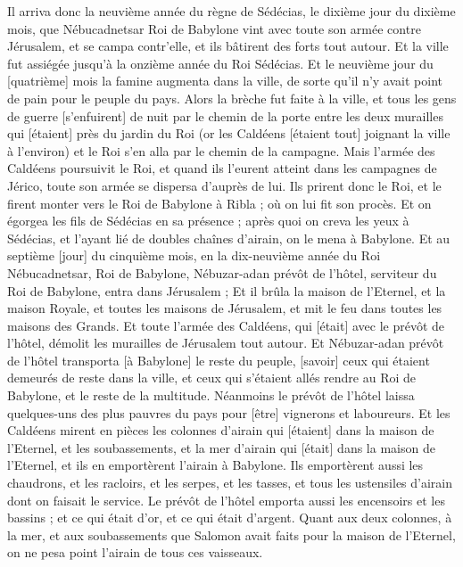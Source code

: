\begin{multicols}{2}
\VerseOne{}Il arriva donc la neuvième année du règne de Sédécias, le dixième jour du dixième mois, que Nébucadnetsar Roi de Babylone vint avec toute son armée contre Jérusalem, et se campa contr'elle, et ils bâtirent des forts tout autour.
Et la ville fut assiégée jusqu'à la onzième année du Roi Sédécias.
Et le neuvième jour du [quatrième] mois la famine augmenta dans la ville, de sorte qu'il n'y avait point de pain pour le peuple du pays.
Alors la brèche fut faite à la ville, et tous les gens de guerre [s'enfuirent] de nuit par le chemin de la porte entre les deux murailles qui [étaient] près du jardin du Roi (or les Caldéens [étaient tout] joignant la ville à l'environ) et le Roi s'en alla par le chemin de la campagne.
Mais l'armée des Caldéens poursuivit le Roi, et quand ils l'eurent atteint dans les campagnes de Jérico, toute son armée se dispersa d'auprès de lui.
Ils prirent donc le Roi, et le firent monter vers le Roi de Babylone à Ribla ; où on lui fit son procès.
Et on égorgea les fils de Sédécias en sa présence ; après quoi on creva les yeux à Sédécias, et l'ayant lié de doubles chaînes d'airain, on le mena à Babylone.
Et au septième [jour] du cinquième mois, en la dix-neuvième année du Roi Nébucadnetsar, Roi de Babylone, Nébuzar-adan prévôt de l'hôtel, serviteur du Roi de Babylone, entra dans Jérusalem ;
Et il brûla la maison de l'Eternel, et la maison Royale, et toutes les maisons de Jérusalem, et mit le feu dans toutes les maisons des Grands.
Et toute l'armée des Caldéens, qui [était] avec le prévôt de l'hôtel, démolit les murailles de Jérusalem tout autour.
Et Nébuzar-adan prévôt de l'hôtel transporta [à Babylone] le reste du peuple, [savoir] ceux qui étaient demeurés de reste dans la ville, et ceux qui s'étaient allés rendre au Roi de Babylone, et le reste de la multitude.
Néanmoins le prévôt de l'hôtel laissa quelques-uns des plus pauvres du pays pour [être] vignerons et laboureurs.
Et les Caldéens mirent en pièces les colonnes d'airain qui [étaient] dans la maison de l'Eternel, et les soubassements, et la mer d'airain qui [était] dans la maison de l'Eternel, et ils en emportèrent l'airain à Babylone.
Ils emportèrent aussi les chaudrons, et les racloirs, et les serpes, et les tasses, et tous les ustensiles d'airain dont on faisait le service.
Le prévôt de l'hôtel emporta aussi les encensoirs et les bassins ; et ce qui était d'or, et ce qui était d'argent.
Quant aux deux colonnes, à la mer, et aux soubassements que Salomon avait faits pour la maison de l'Eternel, on ne pesa point l'airain de tous ces vaisseaux.

\end{multicols}
